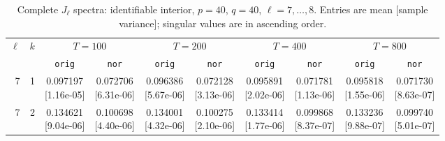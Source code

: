 \documentclass[12pt,letterpaper]{article}
\def\spacingset#1{\renewcommand{\baselinestretch}{#1}\small\normalsize}
\theoremstyle{plain}
\theoremstyle{definition}
\begin{document}
\clearpage
\begin{table}[p]
\begingroup
\spacingset{1.0}
\small\centering
\caption{Complete $J_\ell$ spectra: identifiable interior, $p=40$, $q=40$, $\ell=7,\ldots,8$. Entries are mean [sample variance]; singular values are in ascending order.}
\label{s23:lambda:alltab:spectra:p40q40interior:7-8}
\footnotesize
\setlength{\tabcolsep}{2.2pt}
\renewcommand{\arraystretch}{1.03}
\begin{adjustbox}{max width=\linewidth}
\begin{tabular}{@{}rr*{8}{c}@{}}
\toprule
$\ell$ & $k$ & \multicolumn{2}{c}{$T=100$} & \multicolumn{2}{c}{$T=200$} & \multicolumn{2}{c}{$T=400$} & \multicolumn{2}{c}{$T=800$}\\
\cmidrule(lr){3-4}\cmidrule(lr){5-6}\cmidrule(lr){7-8}\cmidrule(lr){9-10}
 &  & \texttt{orig} & \texttt{nor} & \texttt{orig} & \texttt{nor} & \texttt{orig} & \texttt{nor} & \texttt{orig} & \texttt{nor}\\
\midrule
7 & 1 & \shortstack{0.097197\\[-1pt]{\scriptsize[1.16e-05]}} & \shortstack{0.072706\\[-1pt]{\scriptsize[6.31e-06]}} & \shortstack{0.096386\\[-1pt]{\scriptsize[5.67e-06]}} & \shortstack{0.072128\\[-1pt]{\scriptsize[3.13e-06]}} & \shortstack{0.095891\\[-1pt]{\scriptsize[2.02e-06]}} & \shortstack{0.071781\\[-1pt]{\scriptsize[1.13e-06]}} & \shortstack{0.095818\\[-1pt]{\scriptsize[1.55e-06]}} & \shortstack{0.071730\\[-1pt]{\scriptsize[8.63e-07]}}\\
7 & 2 & \shortstack{0.134621\\[-1pt]{\scriptsize[9.04e-06]}} & \shortstack{0.100698\\[-1pt]{\scriptsize[4.40e-06]}} & \shortstack{0.134001\\[-1pt]{\scriptsize[4.32e-06]}} & \shortstack{0.100275\\[-1pt]{\scriptsize[2.10e-06]}} & \shortstack{0.133414\\[-1pt]{\scriptsize[1.77e-06]}} & \shortstack{0.099868\\[-1pt]{\scriptsize[8.37e-07]}} & \shortstack{0.133236\\[-1pt]{\scriptsize[9.88e-07]}} & \shortstack{0.099740\\[-1pt]{\scriptsize[5.01e-07]}}\\

\end{tabular}
\end{adjustbox}
\end{table}
\end{document}
